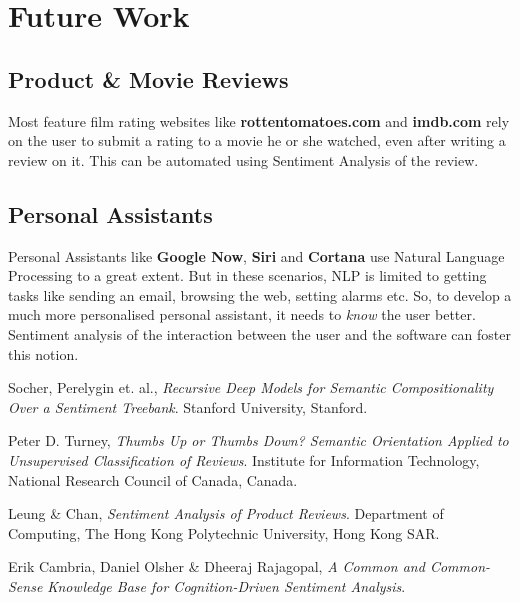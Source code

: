 \documentclass{llncs}
\begin{document}
\section{Future Work}

\subsection{Product \& Movie Reviews}
Most feature film rating websites like \textbf{rottentomatoes.com} and \textbf{imdb.com} rely on the user to submit a rating to a movie he or she watched, even after writing a review on it. This can be automated using Sentiment Analysis of the review.

\subsection{Personal Assistants}
Personal Assistants like \textbf{Google Now}, \textbf{Siri} and \textbf{Cortana} use Natural Language Processing to a great extent. But in these scenarios, NLP is limited to getting tasks like sending an email, browsing the web, setting alarms etc. So, to develop a much more personalised personal assistant, it needs to \emph{know} the user better. Sentiment analysis of the interaction between the user and the software can foster this notion.

\begin{thebibliography}{9}

  Socher, Perelygin et. al., \emph{Recursive Deep Models for Semantic Compositionality Over a Sentiment Treebank}. 
  Stanford University, Stanford.
  
  Peter D. Turney, \emph{Thumbs Up or Thumbs Down? Semantic Orientation Applied to Unsupervised Classification of Reviews}. 
  Institute for Information Technology, National Research Council of Canada, Canada.  
  
  Leung \& Chan, \emph{Sentiment Analysis of Product Reviews}. 
  Department of Computing, The Hong Kong Polytechnic University, Hong Kong SAR.

  Erik Cambria, Daniel Olsher \& Dheeraj Rajagopal, \emph{A Common and Common-Sense Knowledge Base
for Cognition-Driven Sentiment Analysis}.

\end{thebibliography}
\end{document}
